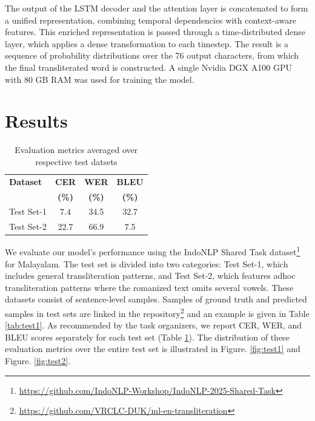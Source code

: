 \documentclass[11pt]{article}
\begin{document}
The output of the LSTM decoder and the attention layer is concatenated to form a unified representation, combining temporal dependencies with context-aware features. This enriched representation is passed through a time-distributed dense layer, which applies a dense transformation to each timestep. The result is a sequence of probability distributions over the 76 output characters, from which the final transliterated word is constructed.  A single Nvidia DGX A100 GPU with 80 GB RAM was used for training the model.
\vspace{-.2cm}


\section{Results}
\vspace{-.4cm}

\begin{table}[htpb]
  \caption{Evaluation metrics averaged over respective test datsets}   \label{tab:final}
  \centering
   \begin{tabular}{lccc}

    \hline
    \textbf{Dataset} & \textbf{CER} & \textbf{WER} &\textbf{BLEU}\\
    & \textbf{(\%)} & \textbf{(\%)} &\textbf{(\%)}\\
    \hline
Test Set-1 & 7.4 &  34.5 & 32.7 \\ \hline
Test Set-2 & 22.7 & 66.9 & 7.5 \\ \hline

    \hline
  \end{tabular}

\end{table}

We evaluate our model's performance using the IndoNLP Shared Task dataset\footnote{\url{https://github.com/IndoNLP-Workshop/IndoNLP-2025-Shared-Task}} for Malayalam. The test set is divided into two categories: Test Set-1, which includes general transliteration patterns, and Test Set-2, which features adhoc transliteration patterns where the romanized text omits several vowels.  These datasets consist of sentence-level samples. Samples of ground truth and predicted samples in test sets are linked in the repository\footnote{\url{https://github.com/VRCLC-DUK/ml-en-transliteration}} and an example is given in Table \ref{tab:test1}. As recommended by the task organizers, we report CER, WER, and BLEU scores separately for each test set (Table \ref{tab:final}). The distribution of these evaluation metrics over the entire test set is illustrated in Figure. \ref{fig:test1} and Figure. \ref{fig:test2}.
\end{document}
